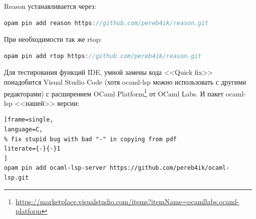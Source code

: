 Reason устанавливается через:
\lstset{basicstyle=\ttfamily}
\begin{example}
\begin{lstlisting}[frame=single,language=C]
opam pin add reason https://github.com/pereb4ik/reason.git
\end{lstlisting}
\caption{}
\end{example}
При необходимости так же rtop:
\begin{example}
\begin{lstlisting}[frame=single,language=C]
opam pin add rtop https://github.com/pereb4ik/reason.git
\end{lstlisting}
\caption{}
\end{example}
Для тестирования функций IDE, умной замены кода <<Quick fix>> понадобится Visual Studio Code (хотя ocaml-lsp можно использовать с другими редакторами) с расширением OCaml Platform\footnote[4]{ \url{https://marketplace.visualstudio.com/items?itemName=ocamllabs.ocaml-platform} } от OCaml Labs. И пакет ocaml-lsp <<нашей>> версии:
\begin{example}
\begin{lstlisting}[frame=single,
language=C,
% fix stupid bug with bad "-" in copying from pdf
literate={-}{-}1
]
opam pin add ocaml-lsp-server https://github.com/pereb4ik/ocaml-lsp.git
\end{lstlisting}
\caption{}
\end{example}